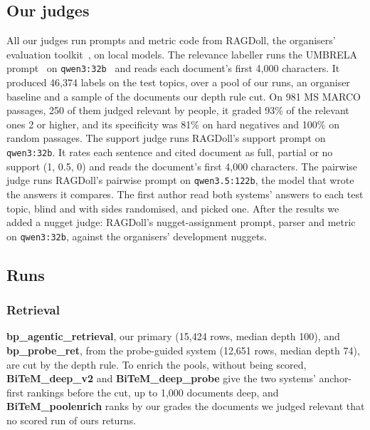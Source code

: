 \documentclass[sigconf,nonacm]{acmart}
\newcommand{\run}[1]{\mbox{\textbf{#1}}}   %
\begin{document}
\subsection{Our judges}
\label{sec:judges-method}
All our judges run prompts and metric code from RAGDoll, the organisers' evaluation
toolkit~\cite{ragdoll}, on local models. The relevance labeller runs the UMBRELA
prompt~\cite{upadhyay2024umbrela} on \texttt{qwen3:32b}~\cite{qwen2025technical} and
reads each document's first 4,000 characters. It produced 46,374 labels on the test
topics, over a pool of our runs, an organiser baseline and a sample of the documents
our depth rule cut. On 981 MS MARCO passages, 250 of them judged relevant by people,
it graded 93\% of the relevant ones 2 or higher, and its specificity was 81\% on hard
negatives and 100\% on random passages. The support judge runs RAGDoll's support
prompt on \texttt{qwen3:32b}. It rates each sentence and cited document as full,
partial or no support (1, 0.5, 0) and reads the document's first 4,000 characters.
The pairwise judge runs RAGDoll's pairwise prompt on \texttt{qwen3.5:122b}, the model
that wrote the answers it compares. The first author read both systems' answers to
each test topic, blind and with sides randomised, and picked one. After the results
we added a nugget judge: RAGDoll's nugget-assignment prompt, parser and metric on
\texttt{qwen3:32b}, against the organisers' development nuggets.

\subsection{Runs}
\label{sec:runs}

\subsubsection{Retrieval}
\run{bp\_agentic\_retrieval}, our primary (15,424 rows, median depth 100), and
\run{bp\_probe\_ret}, from the probe-guided system (12,651 rows, median depth 74),
are cut by the depth rule. To enrich the pools, without being scored,
\run{BiTeM\_deep\_v2} and \run{BiTeM\_deep\_probe} give the two systems' anchor-first
rankings before the cut, up to 1,000 documents deep, and \run{BiTeM\_poolenrich}
ranks by our grades the documents we judged relevant that no scored run of ours
returns.
\end{document}
